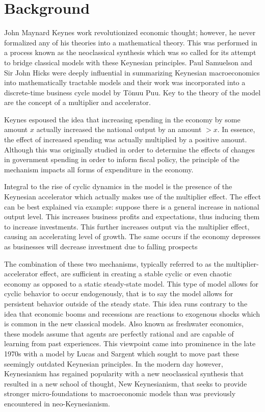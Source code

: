 \section{Background}
John Maynard Keynes work revolutionized economic thought; however, he never formalized any of his theories into a mathematical theory. This was performed in a process known as the neoclassical synthesis which was so called for its attempt to bridge classical models with these Keynesian principles. Paul Samuelson and Sir John Hicks were deeply influential in summarizing Keynesian macroeconomics into mathematically tractable models and their work was incorporated into a discrete-time business cycle model by T\"{o}nuu Puu\autocite{Puu2003}. Key to the theory of the model are the concept of a multiplier and accelerator.

Keynes espoused the idea that increasing spending in the economy by some amount $x$ actually increased the national output by an amount $>x$. In essence, the effect of increased spending was actually multiplied by a positive amount. Although this was originally studied in order to determine the effects of changes in government spending in order to inform fiscal policy\autocite{Samuelson1939}, the principle of the mechanism impacts all forms of expenditure in the economy. 

Integral to the rise of cyclic dynamics in the model is the presence of the Keynesian accelerator which actually makes use of the multiplier effect. The effect can be best explained via example: suppose there is a general increase in national output level. This increases business profits and expectations, thus inducing them to increase investments. This further increases output via the multiplier effect, causing an accelerating level of growth. The same occurs if the economy depresses as businesses will decrease investment due to falling prospects\autocite{Jorgenson1963}

The combination of these two mechanisms, typically referred to as the multiplier-accelerator effect, are sufficient in creating a stable cyclic or even chaotic economy as opposed to a static steady-state model. This type of model allows for cyclic behavior to occur endogenously, that is to say the model allows for persistent behavior outside of the steady state. This idea runs contrary to the idea that economic booms and recessions are reactions to exogenous shocks which is common in the new classical models. Also known as freshwater economics, these models assume that agents are perfectly rational and are capable of learning from past experiences. This viewpoint came into prominence in the late 1970s with a model by Lucas and Sargent\autocite{Lucas1979} which sought to move past these seemingly outdated Keynesian principles. In the modern day however, Keynesianism has regained popularity with a new neoclassical synthesis that resulted in a new school of thought, New Keynesianism, that seeks to provide stronger micro-foundations to macroeconomic models than was previously encountered in neo-Keynesianism. 
